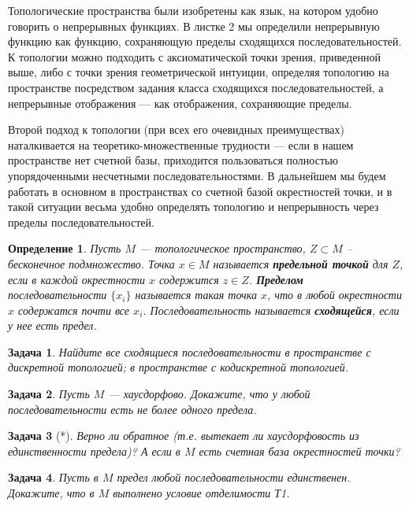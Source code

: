 \documentclass[12pt]{book}
\theoremstyle{upshape}
\newtheorem{zadacha}{Задача}[chapter]
\theoremstyle{generic}
\newtheorem{opredelenie}[teorema]{Определение}
\theoremstyle{upshapenonumber}
\newcommand{\следствие}{%
     \refstepcounter{teorema}
     {\noindent\bf Следствие \thechapter.\arabic{teorema}:\ }}
\newcommand{\пример}{%
     \refstepcounter{teorema}
     {\noindent\bf Пример \thechapter.\arabic{teorema}:\ }}
\newcommand{\лемма}{%
     \refstepcounter{teorema}
     {\noindent\bf Лемма \thechapter.\arabic{teorema}:\ }}
\newcommand{\теорема}{%
     \refstepcounter{teorema}
     {\noindent\bf Теорема \thechapter.\arabic{teorema}:\ }}
\newcommand{\утверждение}{%
     \refstepcounter{teorema}
     {\noindent\bf Утверждение \thechapter.\arabic{teorema}:\ }}
\begin{document}
{Топологические пространства были изобретены как язык, на котором
удобно говорить о непрерывных функциях. В листке 2 мы
определили непрерывную функцию как функцию, сохраняющую пределы
сходящихся последовательностей. К топологии можно подходить с
аксиоматической точки зрения, приведенной выше, либо с точки зрения
геометрической интуиции, определяя топологию на пространстве
посредством задания класса сходящихся последовательностей, а
непрерывные отображения --- как отображения, сохраняющие пределы.

Второй подход к топологии (при всех его очевидных преимуществах)
наталкивается на теоретико-множественные трудности --- если в нашем
пространстве нет счетной базы, приходится пользоваться полностью
упорядоченными несчетными последовательностями. В дальнейшем мы
будем работать в основном в пространствах со счетной базой
окрестностей точки, и в такой ситуации весьма удобно определять
топологию и непрерывность через пределы последовательностей.

\begin{opredelenie} 
Пусть $M$ --- топологическое пространство, $Z\subset M$ --
бесконечное подмножество. Точка $x\in M$ называется {\bf предельной
точкой} для $Z$, если в каждой окрестности $x$ содержится $z\in
Z$. {\bf Пределом} последовательности $\{ x_i\}$ называется такая
точка $x$, что в любой окрестности $x$ содержатся почти все $x_i$.
Последовательность называется {\bf сходящейся}, если у нее есть
предел. 
\end{opredelenie}

\begin{zadacha}
Найдите все сходящиеся последовательности в пространстве с
дискретной топологией; в пространстве с кодискретной топологией.
\end{zadacha}

\begin{zadacha}
Пусть $M$ --- хаусдорфово. Докажите, что у любой последовательности
 есть не более одного предела.
\end{zadacha}

\begin{zadacha}[*]
Верно ли обратное (т.е. вытекает ли хаусдорфовость из единственности
предела)?  А если в $M$ есть счетная база окрестностей точки? 
\end{zadacha}

\begin{zadacha} 
Пусть в $M$ предел любой последовательности единственен. Докажите,
что в $M$ выполнено условие отделимости Т1.
\end{zadacha}

}
\end{document}
